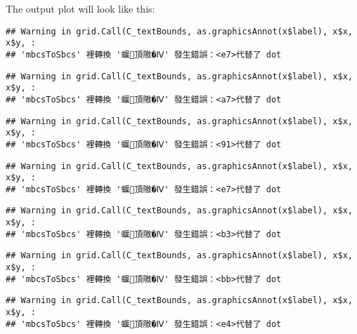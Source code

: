\documentclass[
]{article}
\newenvironment{Shaded}{\begin{snugshade}}{\end{snugshade}}
\newcommand{\FunctionTok}[1]{\textcolor[rgb]{0.00,0.00,0.00}{#1}}
\newcommand{\NormalTok}[1]{#1}
\newcommand{\OtherTok}[1]{\textcolor[rgb]{0.56,0.35,0.01}{#1}}
\newcommand{\SpecialCharTok}[1]{\textcolor[rgb]{0.00,0.00,0.00}{#1}}
\newcommand{\StringTok}[1]{\textcolor[rgb]{0.31,0.60,0.02}{#1}}
\begin{document}
The output plot will look like this:

\begin{Shaded}
\end{Shaded}

\begin{verbatim}
## Warning in grid.Call(C_textBounds, as.graphicsAnnot(x$label), x$x, x$y, :
## 'mbcsToSbcs' 裡轉換 '蝘頂隞�Ⅳ' 發生錯誤：<e7>代替了 dot
\end{verbatim}

\begin{verbatim}
## Warning in grid.Call(C_textBounds, as.graphicsAnnot(x$label), x$x, x$y, :
## 'mbcsToSbcs' 裡轉換 '蝘頂隞�Ⅳ' 發生錯誤：<a7>代替了 dot
\end{verbatim}

\begin{verbatim}
## Warning in grid.Call(C_textBounds, as.graphicsAnnot(x$label), x$x, x$y, :
## 'mbcsToSbcs' 裡轉換 '蝘頂隞�Ⅳ' 發生錯誤：<91>代替了 dot
\end{verbatim}

\begin{verbatim}
## Warning in grid.Call(C_textBounds, as.graphicsAnnot(x$label), x$x, x$y, :
## 'mbcsToSbcs' 裡轉換 '蝘頂隞�Ⅳ' 發生錯誤：<e7>代替了 dot
\end{verbatim}

\begin{verbatim}
## Warning in grid.Call(C_textBounds, as.graphicsAnnot(x$label), x$x, x$y, :
## 'mbcsToSbcs' 裡轉換 '蝘頂隞�Ⅳ' 發生錯誤：<b3>代替了 dot
\end{verbatim}

\begin{verbatim}
## Warning in grid.Call(C_textBounds, as.graphicsAnnot(x$label), x$x, x$y, :
## 'mbcsToSbcs' 裡轉換 '蝘頂隞�Ⅳ' 發生錯誤：<bb>代替了 dot
\end{verbatim}

\begin{verbatim}
## Warning in grid.Call(C_textBounds, as.graphicsAnnot(x$label), x$x, x$y, :
## 'mbcsToSbcs' 裡轉換 '蝘頂隞�Ⅳ' 發生錯誤：<e4>代替了 dot
\end{verbatim}
\end{document}

